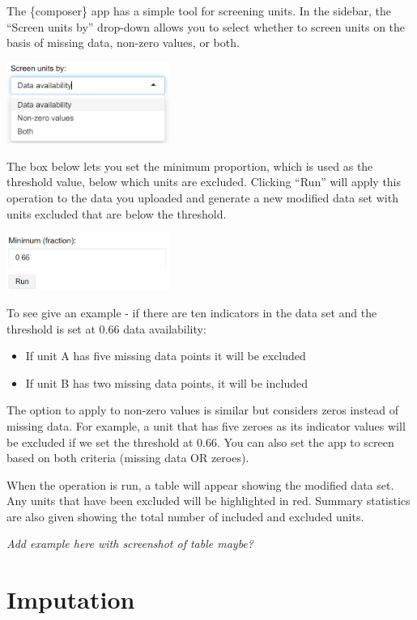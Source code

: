 \documentclass[
  letterpaper,
  DIV=11,
  numbers=noendperiod]{scrreprt}
\providecommand{\tightlist}{%
  \setlength{\itemsep}{0pt}\setlength{\parskip}{0pt}}\usepackage{longtable,booktabs,array}
\begin{document}
The \{composer\} app has a simple tool for screening units. In the
sidebar, the ``Screen units by'' drop-down allows you to select whether
to screen units on the basis of missing data, non-zero values, or both.

\includegraphics[width=0.4\textwidth,height=\textheight]{figs/screening_1.png}

The box below lets you set the minimum proportion, which is used as the
threshold value, below which units are excluded. Clicking ``Run'' will
apply this operation to the data you uploaded and generate a new
modified data set with units excluded that are below the threshold.

\includegraphics[width=0.4\textwidth,height=\textheight]{figs/screening_2.png}

To see give an example - if there are ten indicators in the data set and
the threshold is set at 0.66 data availability:

\begin{itemize}
\tightlist
\item
  If unit A has five missing data points it will be excluded
\item
  If unit B has two missing data points, it will be included
\end{itemize}

The option to apply to non-zero values is similar but considers zeros
instead of missing data. For example, a unit that has five zeroes as its
indicator values will be excluded if we set the threshold at 0.66. You
can also set the app to screen based on both criteria (missing data OR
zeroes).

When the operation is run, a table will appear showing the modified data
set. Any units that have been excluded will be highlighted in red.
Summary statistics are also given showing the total number of included
and excluded units.

\emph{Add example here with screenshot of table maybe?}

\hypertarget{sec-imputation}{%
\chapter{Imputation}\label{sec-imputation}}
\end{document}
